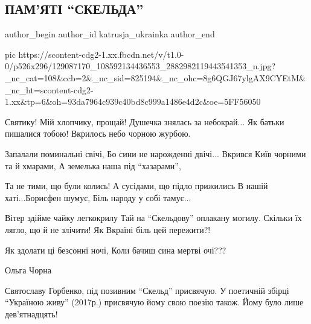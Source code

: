  
 
 
 
 
 
\subsection{ПАМ'ЯТІ \enquote{СКЕЛЬДА}}
\label{sec:04_12_2020.fb.katrusja_ukrainka.1.pamjati_skelda}
\ifcmt
  author_begin
   author_id katrusja_ukrainka
  author_end
\fi

\ifcmt
pic https://scontent-cdg2-1.xx.fbcdn.net/v/t1.0-0/p526x296/129087170_108592134436553_2882982119443541353_n.jpg?_nc_cat=108&ccb=2&_nc_sid=825194&_nc_ohc=8g6QGJ67ylgAX9CYEtM&_nc_ht=scontent-cdg2-1.xx&tp=6&oh=93da7964c939c40bd8c999a1486e4d2c&oe=5FF56050
\fi

\obeycr
Святику! Мій хлопчику, прощай!
Душечка знялась за небокрай...
Як батьки пишалися тобою!
Вкрилось небо чорною журбою.

Запалали поминальні свічі,
Бо сини не нарожденні двічі...
Вкрився Київ чорними та й хмарами,
А земелька наша під \enquote{хазарами},

Та не тими, що були колись!
А сусідами, що підло прижились
В нашій хаті...Борисфен шумує,
Біль народу у собі тамує...

Вітер здійме чайку легкокрилу
Тай на \enquote{Скельдову} оплакану могилу.
Скільки їх лягло, що й не злічити!
Як Вкраїні біль цей пережити?!

Як здолати ці безсонні ночі,
Коли бачиш сина мертві очі???

Ольга Чорна
\restorecr

Святославу Горбенко, під позивним \enquote{Скельд} присвячую. У поетичній  збірці
\enquote{Україною живу} (2017р.) присвячую йому свою поезію також. Йому було лише
дев'ятнадцять!
